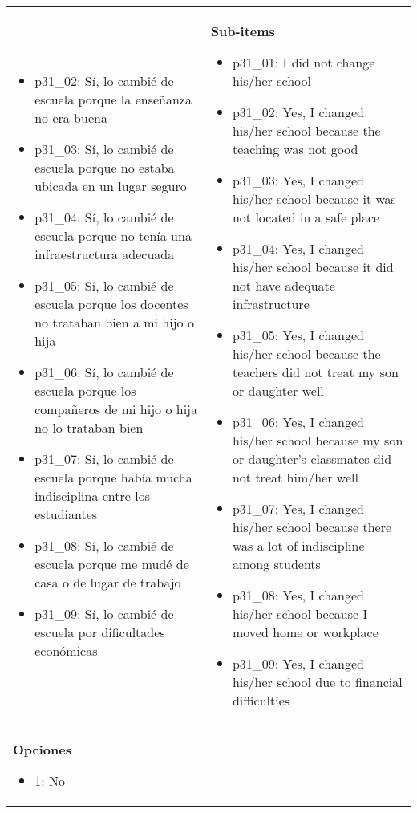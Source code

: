 \documentclass[11pt]{article}
\begin{document}
\begin{longtable}{@{}LL@{}}
\begin{itemize}[leftmargin=*]
\item p31\_02: Sí, lo cambié de escuela porque la enseñanza no era buena
\item p31\_03: Sí, lo cambié de escuela porque no estaba ubicada en un lugar seguro
\item p31\_04: Sí, lo cambié de escuela porque no tenía una infraestructura adecuada
\item p31\_05: Sí, lo cambié de escuela porque los docentes no trataban bien a mi hijo o hija
\item p31\_06: Sí, lo cambié de escuela porque los compañeros de mi hijo o hija no lo trataban bien
\item p31\_07: Sí, lo cambié de escuela porque había mucha indisciplina entre los estudiantes
\item p31\_08: Sí, lo cambié de escuela porque me mudé de casa o de lugar de trabajo
\item p31\_09: Sí, lo cambié de escuela por dificultades económicas\end{itemize} & \textbf{Sub-items}\par\begin{itemize}[leftmargin=*]\item p31\_01: I did not change his/her school
\item p31\_02: Yes, I changed his/her school because the teaching was not good
\item p31\_03: Yes, I changed his/her school because it was not located in a safe place
\item p31\_04: Yes, I changed his/her school because it did not have adequate infrastructure
\item p31\_05: Yes, I changed his/her school because the teachers did not treat my son or daughter well
\item p31\_06: Yes, I changed his/her school because my son or daughter's classmates did not treat him/her well
\item p31\_07: Yes, I changed his/her school because there was a lot of indiscipline among students
\item p31\_08: Yes, I changed his/her school because I moved home or workplace
\item p31\_09: Yes, I changed his/her school due to financial difficulties\end{itemize} \\
\textbf{Opciones}\par\begin{itemize}[leftmargin=*]\item 1: No

\end{itemize}
\end{longtable}
\end{document}

